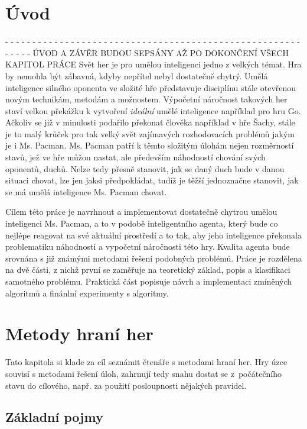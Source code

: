 \chapter{Úvod} 
- - - - - - - - - - - -  - - - - -  - - - - - - - - - - - - - - - - - - - - - - - - - - - - - - - - - - - - - - - - - -
\newline
ÚVOD A ZÁVĚR BUDOU SEPSÁNY AŽ PO DOKONČENÍ VŠECH KAPITOL PRÁCE
\newline
  Svět her je pro umělou inteligenci jedno z velkých témat. Hra by nemohla být zábavná, kdyby nepřítel nebyl dostatečně chytrý. Umělá inteligence silného oponenta ve složité hře představuje disciplínu stále otevřenou novým technikám, metodám a možnostem. Výpočetní náročnost takových her staví velkou překážku k vytvoření \textit{ideální} umělé inteligence například pro hru Go. Ačkoliv se již v minulosti podařilo překonat člověka například v hře Šachy, stále je to malý krůček pro tak velký svět zajímavých rozhodovacích problémů jakým je i Ms. Pacman. Ms. Pacman patří k těmto složitým úlohám nejen rozměrností stavů, jež ve hře můžou nastat, ale především náhodností chování svých oponentů, duchů. Nelze tedy přesně stanovit, jak se daný duch bude v danou situaci chovat, lze jen jaksi předpokládat, tudíž je těžší jednoznačne stanovit, jak se má umělá inteligence Ms. Pacman chovat.

Cílem této práce je navrhnout a implementovat dostatečně chytrou umělou inteligenci Ms. Pacman, a to v podobě inteligentního agenta, který bude co nejlépe reagovat na své aktuální prostředí a to tak, aby jeho inteligence překonala problematiku náhodnosti a vypočetní náročnosti této hry. Kvalita agenta bude srovnána s již známými metodami řešení podobných problémů. Práce je rozdělena na dvě části, z nichž první se zaměřuje na teoretický základ, popis a klasifikaci samotného problému. Praktická část popisuje návrh a implementaci zmíněných algoritmů a finánlní experimenty s algoritmy.

\chapter{Metody hraní her}
Tato kapitola si klade za cíl seznámit čtenáře s metodami hraní her. Hry úzce souvisí s metodami řešení úloh, zahrnují tedy snahu dostat se z počátečního stavu do cílového, např. za použití posloupnosti nějakých pravidel. 

\section{Základní pojmy}

